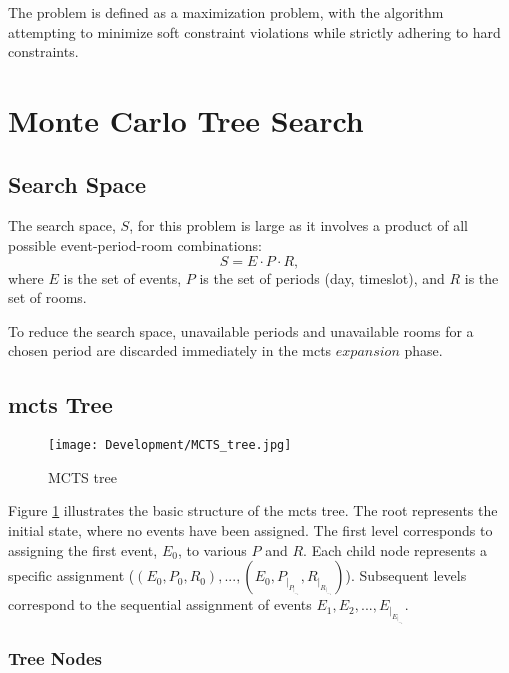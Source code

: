 The problem is defined as a maximization problem, with the algorithm attempting to minimize soft constraint violations while strictly adhering to hard constraints.

\section{Monte Carlo Tree Search}



\subsection{Search Space}

The search space, \(S\),  for this problem is large as it involves a product of all possible event-period-room combinations: \[S = E \cdot P  \cdot R,\] where \(E\) is the set of events, \(P\) is the set of periods (day, timeslot), and \(R\) is the set of rooms.

To reduce the search space, unavailable periods and unavailable rooms for a chosen period are discarded immediately in the \ac{mcts} \(expansion\) phase.

\subsection{\ac{mcts} Tree}

\begin{figure}
      \centering
      \texttt{[image: Development/MCTS\_tree.jpg]}
      \caption[MCTS tree]
      {MCTS tree}
      \label{fig:mcts_tree}
\end{figure}

Figure \ref{fig:mcts_tree} illustrates the basic structure of the \ac{mcts} tree. The root represents the initial state, where no events have been assigned. The first level corresponds to assigning the first event, \(E_0\), to various \(P\) and \(R\). Each child node represents a specific assignment (\((E_0,P_0,R_0),...,(E_0,P_|_P_|_-_1,R_|_R_|_-_1)\)). Subsequent levels correspond to the sequential assignment of events \(E_1, E_2, ..., E_|_E_|_-_1\).

\subsubsection{Tree Nodes}

